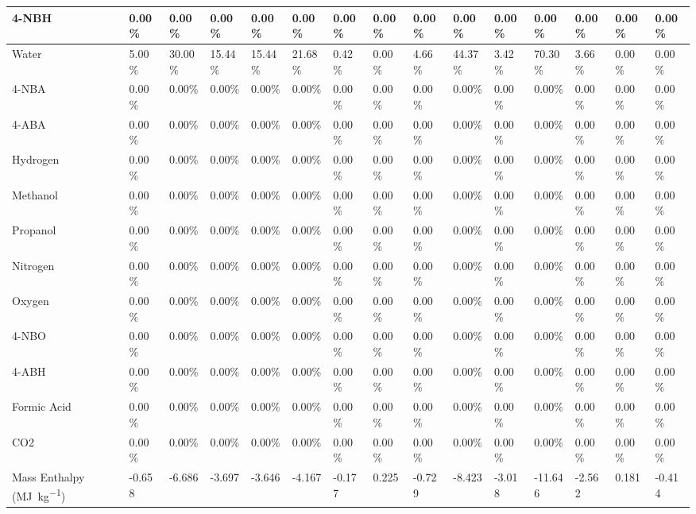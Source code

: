 \begin{landscape}
\begin{table}[H]
\begin{tabular}{|l|l|l|l|l|l|l|l|l|l|l|l|l|l|l|}
4-NBH                   & 0.00\%  & 0.00\%  & 0.00\%  & 0.00\%  & 0.00\%  & 0.00\%  & 0.00\%  & 0.00\%  & 0.00\%  & 0.00\%  & 0.00\%  & 0.00\%  & 0.00\%  & 0.00\%   \\ \hline
Water                   & 5.00\%  & 30.00\% & 15.44\% & 15.44\% & 21.68\% & 0.42\%  & 0.00\%  & 4.66\%  & 44.37\% & 3.42\%  & 70.30\% & 3.66\%  & 0.00\%  & 0.00\%   \\ \hline
4-NBA                   & 0.00\%  & 0.00\%  & 0.00\%  & 0.00\%  & 0.00\%  & 0.00\%  & 0.00\%  & 0.00\%  & 0.00\%  & 0.00\%  & 0.00\%  & 0.00\%  & 0.00\%  & 0.00\%   \\ \hline
4-ABA                   & 0.00\%  & 0.00\%  & 0.00\%  & 0.00\%  & 0.00\%  & 0.00\%  & 0.00\%  & 0.00\%  & 0.00\%  & 0.00\%  & 0.00\%  & 0.00\%  & 0.00\%  & 0.00\%   \\ \hline
Hydrogen                & 0.00\%  & 0.00\%  & 0.00\%  & 0.00\%  & 0.00\%  & 0.00\%  & 0.00\%  & 0.00\%  & 0.00\%  & 0.00\%  & 0.00\%  & 0.00\%  & 0.00\%  & 0.00\%   \\ \hline
Methanol                & 0.00\%  & 0.00\%  & 0.00\%  & 0.00\%  & 0.00\%  & 0.00\%  & 0.00\%  & 0.00\%  & 0.00\%  & 0.00\%  & 0.00\%  & 0.00\%  & 0.00\%  & 0.00\%   \\ \hline
Propanol                & 0.00\%  & 0.00\%  & 0.00\%  & 0.00\%  & 0.00\%  & 0.00\%  & 0.00\%  & 0.00\%  & 0.00\%  & 0.00\%  & 0.00\%  & 0.00\%  & 0.00\%  & 0.00\%   \\ \hline
Nitrogen                & 0.00\%  & 0.00\%  & 0.00\%  & 0.00\%  & 0.00\%  & 0.00\%  & 0.00\%  & 0.00\%  & 0.00\%  & 0.00\%  & 0.00\%  & 0.00\%  & 0.00\%  & 0.00\%   \\ \hline
Oxygen                  & 0.00\%  & 0.00\%  & 0.00\%  & 0.00\%  & 0.00\%  & 0.00\%  & 0.00\%  & 0.00\%  & 0.00\%  & 0.00\%  & 0.00\%  & 0.00\%  & 0.00\%  & 0.00\%   \\ \hline
4-NBO                   & 0.00\%  & 0.00\%  & 0.00\%  & 0.00\%  & 0.00\%  & 0.00\%  & 0.00\%  & 0.00\%  & 0.00\%  & 0.00\%  & 0.00\%  & 0.00\%  & 0.00\%  & 0.00\%   \\ \hline
4-ABH                   & 0.00\%  & 0.00\%  & 0.00\%  & 0.00\%  & 0.00\%  & 0.00\%  & 0.00\%  & 0.00\%  & 0.00\%  & 0.00\%  & 0.00\%  & 0.00\%  & 0.00\%  & 0.00\%   \\ \hline
Formic Acid             & 0.00\%  & 0.00\%  & 0.00\%  & 0.00\%  & 0.00\%  & 0.00\%  & 0.00\%  & 0.00\%  & 0.00\%  & 0.00\%  & 0.00\%  & 0.00\%  & 0.00\%  & 0.00\%   \\ \hline
CO2                     & 0.00\%  & 0.00\%  & 0.00\%  & 0.00\%  & 0.00\%  & 0.00\%  & 0.00\%  & 0.00\%  & 0.00\%  & 0.00\%  & 0.00\%  & 0.00\%  & 0.00\%  & 0.00\%   \\ \hline
Mass Enthalpy (\si{\mega\J\per\kg})    & -0.658  & -6.686  & -3.697  & -3.646  & -4.167  & -0.177  & 0.225   & -0.729  & -8.423  & -3.018  & -11.646 & -2.562  & 0.181   & -0.414   \\ \hline
\end{tabular}
\end{table}




\end{landscape}
